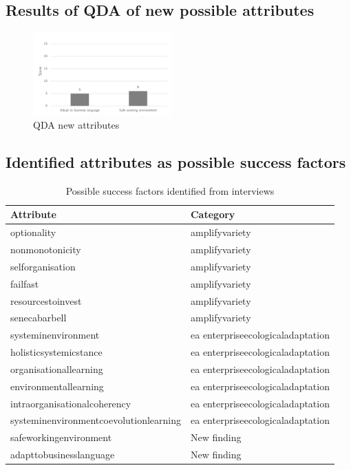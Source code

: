 \subsection{Results of QDA of new possible attributes}
\label{sub:resultsqdanewaatributes}
\begin{figure}[H]
	\centering
	\includegraphics[width=0.475\textwidth]{images/qdanewfindings}
	\caption[QDA new attributes]{QDA new attributes}
	\label{fig:qdanewfindings}
\end{figure}


\subsection{Identified attributes as possible success factors}
\label{sub:identifiedattributesaspossiblesf}
\begin{table}[H]
	\begin{center}
			\begin{tabular}{@{}ll@{}}
				\toprule%
				\textbf{Attribute} & \textbf{Category}  \\%
				\midrule%
				\Gls{optionality} & \Gls{amplifyvariety} \\%
				\Gls{nonmonotonicity} & \Gls{amplifyvariety} \\%
				\Gls{selforganisation} & \Gls{amplifyvariety} \\%
				\Gls{failfast} & \Gls{amplifyvariety} \\%
				\Gls{resourcestoinvest} & \Gls{amplifyvariety} \\%
				\Gls{senecabarbell} & \Gls{amplifyvariety} \\%
				\Gls{systeminenvironment} & \acrshort{ea} \Gls{enterpriseecologicaladaptation} \\%
				\Gls{holisticsystemicstance} & \acrshort{ea} \Gls{enterpriseecologicaladaptation} \\%
				\Gls{organisationallearning} & \acrshort{ea} \Gls{enterpriseecologicaladaptation} \\%
				\Gls{environmentallearning} & \acrshort{ea} \Gls{enterpriseecologicaladaptation} \\%
				\Gls{intraorganisationalcoherency} & \acrshort{ea} \Gls{enterpriseecologicaladaptation} \\%
				\Gls{systeminenvironmentcoevolutionlearning} & \acrshort{ea} \Gls{enterpriseecologicaladaptation} \\%
				\Gls{safeworkingenvironment} & New finding \\%
				\Gls{adapttobusinesslanguage} & New finding \\%
				\bottomrule%
			\end{tabular}
		\caption{Possible success factors identified from interviews}
	\end{center}
\end{table}